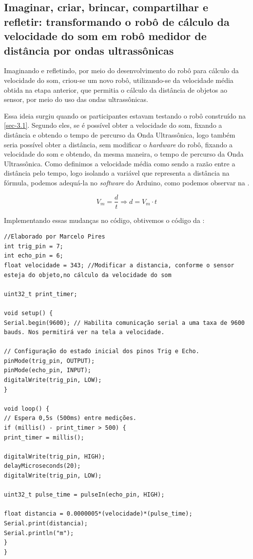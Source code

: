 \documentclass{textolivre}
\begin{document}
\subsection{Imaginar, criar, brincar, compartilhar e refletir: transformando o robô de cálculo da velocidade do som em robô medidor de distância por ondas ultrassônicas}\label{sec-3.2}
Imaginando e refletindo, por meio do desenvolvimento do robô para cálculo da velocidade do som, criou-se um novo robô, utilizando-se da velocidade média obtida na etapa anterior, que permitia o cálculo da distância de objetos ao sensor, por meio do uso das ondas ultrassônicas. 

Essa ideia surgiu quando os participantes estavam testando o robô construído na \cref{sec-3.1}. Segundo eles, se é possível obter a velocidade do som, fixando a distância e obtendo o tempo de percurso da Onda Ultrassônica, logo também seria possível obter a distância, sem modificar o \textit{hardware} do robô, fixando a velocidade do som e obtendo, da mesma maneira, o tempo de percurso da Onda Ultrassônica. Como definimos a velocidade média como sendo a razão entre a distância pelo tempo, logo isolando a variável que representa a distância na fórmula, podemos adequá-la no \textit{software} do Arduino, como podemos observar na .

\begin{equation}\label{eq02}
V_m = \frac{d}{t} \Rightarrow d = V_m \cdot t
\end{equation}

Implementando essas mudanças no código, obtivemos o código da :

\begin{lstlisting}[label=lst04, caption={Programa para o cálculo da distância por meio da velocidade do som no Arduino.}, source={Arquivo pessoal.}]
//Elaborado por Marcelo Pires
int trig_pin = 7;
int echo_pin = 6;
float velocidade = 343; //Modificar a distancia, conforme o sensor esteja do objeto,no cálculo da velocidade do som
 
uint32_t print_timer;
 
void setup() {
Serial.begin(9600); // Habilita comunicação serial a uma taxa de 9600 bauds. Nos permitirá ver na tela a velocidade.
 
// Configuração do estado inicial dos pinos Trig e Echo.
pinMode(trig_pin, OUTPUT);
pinMode(echo_pin, INPUT);
digitalWrite(trig_pin, LOW);
}
 
void loop() {
// Espera 0,5s (500ms) entre medições.
if (millis() - print_timer > 500) {
print_timer = millis();
 
digitalWrite(trig_pin, HIGH);
delayMicroseconds(20);
digitalWrite(trig_pin, LOW);
 
uint32_t pulse_time = pulseIn(echo_pin, HIGH);

float distancia = 0.0000005*(velocidade)*(pulse_time);
Serial.print(distancia);
Serial.println("m");
}
}
\end{lstlisting} %
\end{document}
